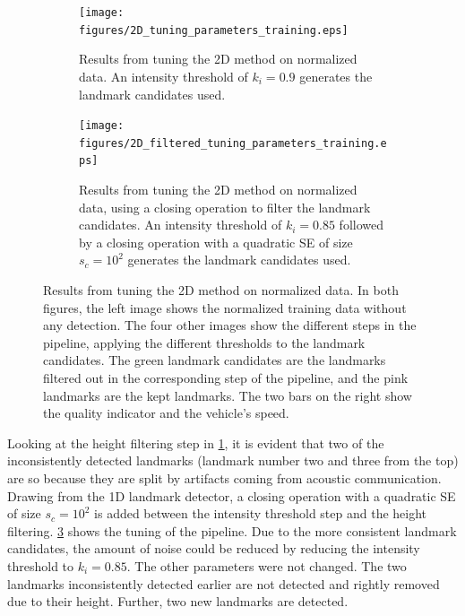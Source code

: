\begin{figure} %
     \centering
    \begin{subfigure}[t]{0.975\textwidth}
        \centering
        \texttt{[image: figures/2D\_tuning\_parameters\_training.eps]}
        \caption{Results from tuning the 2D method on normalized data. An intensity threshold of $k_i = 0.9$ generates the landmark candidates used.}
        \label{fig:2d_tuning_paramaters_training}
     \end{subfigure}
     \hfill
     \begin{subfigure}[b]{0.975\textwidth}
        \texttt{[image: figures/2D\_filtered\_tuning\_parameters\_training.eps]}
        \caption{Results from tuning the 2D method on normalized data, using a closing operation to filter the landmark candidates. An intensity threshold of $k_i = 0.85$ followed by a closing operation with a quadratic SE of size $s_c = 10^2$ generates the landmark candidates used.}
        \label{fig:2d_tuning_paramaters_w_filtering_training}
     \end{subfigure}
        \caption{Results from tuning the 2D method on normalized data. In both figures, the left image shows the normalized training data without any detection. The four other images show the different steps in the pipeline, applying the different thresholds to the landmark candidates. The green landmark candidates are the landmarks filtered out in the corresponding step of the pipeline, and the pink landmarks are the kept landmarks. The two bars on the right show the quality indicator and the vehicle's speed.}
\end{figure}

Looking at the height filtering step in \cref{fig:2d_tuning_paramaters_training}, it is evident that two of the inconsistently detected landmarks (landmark number two and three from the top) are so because they are split by artifacts coming from acoustic communication. Drawing from the 1D landmark detector, a closing operation with a quadratic SE of size $s_c = 10^2$ is added between the intensity threshold step and the height filtering. \cref{fig:2d_tuning_paramaters_w_filtering_training} shows the tuning of the pipeline. Due to the more consistent landmark candidates, the amount of noise could be reduced by reducing the intensity threshold to $k_i = 0.85$. The other parameters were not changed. The two landmarks inconsistently detected earlier are not detected and rightly removed due to their height. Further, two new landmarks are detected. 

